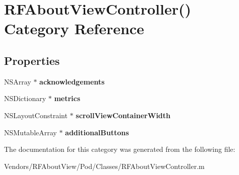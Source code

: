 \hypertarget{category_r_f_about_view_controller_07_08}{}\section{R\+F\+About\+View\+Controller() Category Reference}
\label{category_r_f_about_view_controller_07_08}
\subsection*{Properties}
\begin{DoxyCompactItemize}
\item 
\hypertarget{category_r_f_about_view_controller_07_08_ad67372e797c8999a695cca529aaa5d60}{}N\+S\+Array $\ast$ {\bfseries acknowledgements}\label{category_r_f_about_view_controller_07_08_ad67372e797c8999a695cca529aaa5d60}

\item 
\hypertarget{category_r_f_about_view_controller_07_08_ab48170c964a8d4eeb7a94b596e8736fb}{}N\+S\+Dictionary $\ast$ {\bfseries metrics}\label{category_r_f_about_view_controller_07_08_ab48170c964a8d4eeb7a94b596e8736fb}

\item 
\hypertarget{category_r_f_about_view_controller_07_08_ad4c00efb15561d9ddaa0c0dace2295f1}{}N\+S\+Layout\+Constraint $\ast$ {\bfseries scroll\+View\+Container\+Width}\label{category_r_f_about_view_controller_07_08_ad4c00efb15561d9ddaa0c0dace2295f1}

\item 
\hypertarget{category_r_f_about_view_controller_07_08_ae0bd1b9552e4b31b8a08ca5584feb509}{}N\+S\+Mutable\+Array $\ast$ {\bfseries additional\+Buttons}\label{category_r_f_about_view_controller_07_08_ae0bd1b9552e4b31b8a08ca5584feb509}

\end{DoxyCompactItemize}


The documentation for this category was generated from the following file\+:\begin{DoxyCompactItemize}
\item 
Vendors/\+R\+F\+About\+View/\+Pod/\+Classes/R\+F\+About\+View\+Controller.\+m\end{DoxyCompactItemize}
